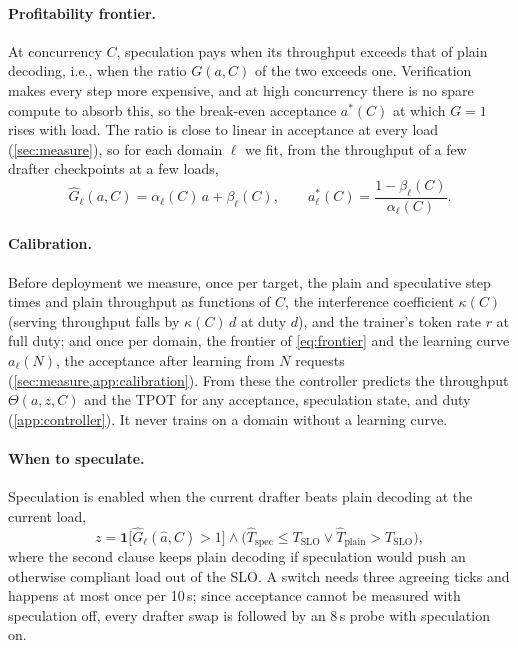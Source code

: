 \documentclass{article}
\newcommand{\Ghat}{\widehat{G}}
\newcommand{\Tslo}{T_{\mathrm{SLO}}}
\begin{document}
\paragraph{Profitability frontier.} At concurrency $C$, speculation pays when its throughput exceeds that of plain decoding, i.e., when the ratio $G(a,C)$ of the two exceeds one. Verification makes every step more expensive, and at high concurrency there is no spare compute to absorb this, so the break-even acceptance $a^{*}(C)$ at which $G=1$ rises with load. The ratio is close to linear in acceptance at every load (\cref{sec:measure}), so for each domain $\ell$ we fit, from the throughput of a few drafter checkpoints at a few loads,
\begin{equation}
\Ghat_\ell(a,C)=\alpha_\ell(C)\,a+\beta_\ell(C),\qquad a^{*}_\ell(C)=\frac{1-\beta_\ell(C)}{\alpha_\ell(C)}.\label{eq:frontier}
\end{equation}

\paragraph{Calibration.} Before deployment we measure, once per target, the plain and speculative step times and plain throughput as functions of $C$, the interference coefficient $\kappa(C)$ (serving throughput falls by $\kappa(C)\,d$ at duty $d$), and the trainer's token rate $r$ at full duty; and once per domain, the frontier of \cref{eq:frontier} and the learning curve $a_\ell(N)$, the acceptance after learning from $N$ requests (\cref{sec:measure,app:calibration}). From these the controller predicts the throughput $\Theta(a,z,C)$ and the TPOT for any acceptance, speculation state, and duty (\cref{app:controller}). It never trains on a domain without a learning curve.

\paragraph{When to speculate.} Speculation is enabled when the current drafter beats plain decoding at the current load,
\begin{equation}
z=\mathbf{1}\big[\Ghat_\ell(\hat a,C)>1\big]\wedge\big(\widehat T_{\mathrm{spec}}\le\Tslo\vee\widehat T_{\mathrm{plain}}>\Tslo\big),\label{eq:switch}
\end{equation}
where the second clause keeps plain decoding if speculation would push an otherwise compliant load out of the SLO. A switch needs three agreeing ticks and happens at most once per 10\,s; since acceptance cannot be measured with speculation off, every drafter swap is followed by an 8\,s probe with speculation on.
\end{document}

